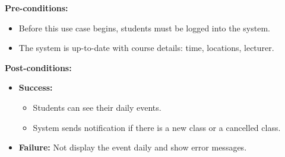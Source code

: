 \documentclass[12pt]{article}
\begin{document}
    \pagebreak

    \noindent \textbf{Pre-conditions:} 
        \begin{itemize}
            \item Before this use case begins, students must be logged into the system.
            \item The system is up-to-date with course details: time, locations, lecturer.
        \end{itemize}

    \noindent \textbf{Post-conditions:}
    \begin{itemize}
        \item \textbf{Success:} 
        \begin{itemize}
            \item Students can see their daily events.
            \item System sends notification if there is a new class or a cancelled class.
        \end{itemize}
        \item \textbf{Failure:} Not display the event daily and show error messages.
    \end{itemize}
\end{document}
